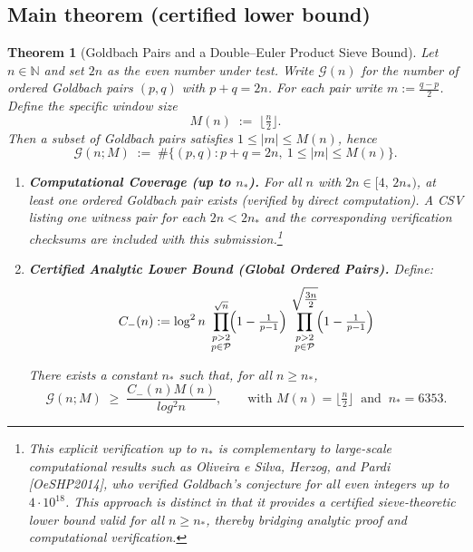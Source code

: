 \documentclass[11pt]{article}
\theoremstyle{inline}
\theoremstyle{break}
\theoremstyle{break}
\theoremstyle{break}
\newtheorem{theorem}{Theorem}
\theoremstyle{break}
\theoremstyle{break}
\theoremstyle{break}
\theoremstyle{break}
\theoremstyle{inline}
\newcommand{\xMertens}{6353} %
\newcommand{\CminusProduct}{C_{-}}
\newcommand{\nprodstar}{n_{\ast}}  %
\begin{document}
\subsection{Main theorem (certified lower bound)}\label{sec:main-thm}
\begin{theorem}[Goldbach Pairs and a Double–Euler Product Sieve Bound]
\label{thm:main}
Let \(n\in\mathbb{N}\) and set \(2n\) as the even number under test.
Write \(\mathcal{G}(n)\) for the number of \emph{ordered} Goldbach pairs \((p,q)\) with \(p+q=2n\).
For each pair write \(m := \tfrac{q-p}{2}\).
Define the specific window size
\begin{equation}
M(n) \;:=\; \bigl\lfloor \tfrac{n}{2} \bigr\rfloor .
\end{equation}
Then a subset of Goldbach pairs satisfies \(1 \le |m| \le M(n)\), hence
\begin{equation}
\mathcal{G}(n;M) \;:=\; \#\{(p,q): p+q=2n,\ 1\le |m| \le M(n)\}.
\end{equation}

\begin{enumerate}
   \item \textbf{Computational Coverage (up to \(\nprodstar\)).}
   For all \(n\) with \(2n \in [4,\,2\nprodstar)\), at least one ordered Goldbach pair exists
   (verified by direct computation). A CSV listing one witness pair for each \(2n<2\nprodstar\) and the
   corresponding verification checksums are included with this submission.\footnote{This explicit verification up to \( \nprodstar \) is complementary to large-scale computational results such as Oliveira e Silva, Herzog, and Pardi [OeSHP2014], who verified Goldbach’s conjecture for all even integers up to \( 4\cdot 10^{18} \).  This approach is distinct in that it provides a certified sieve-theoretic lower bound valid for all \( n \ge \nprodstar \), thereby bridging analytic proof and computational verification.}

  \item \textbf{Certified Analytic Lower Bound (Global Ordered Pairs).}
  Define:
  \begin{equation}
    \CminusProduct(n) := \log^2{n} \;
      \prod_{\substack{p>2\\ p\in\mathcal{P}}}^{\sqrt{n}}
        \!\Bigl(1-\tfrac{1}{p-1}\Bigr)\,
      \prod_{\substack{p>2\\ p\in\mathcal{P}}}^{\sqrt{\tfrac{3n}{2}}}
        \!\Bigl(1-\tfrac{1}{p-1}\Bigr)
     \label{eq:cminus-product-definition}
   \end{equation}

  There exists a constant \( \nprodstar \) such that, for all \(n \ge \nprodstar\),
  \begin{equation}
    \mathcal{G}(n;M)\;\ge\;\frac{\CminusProduct(n)M(n)}{log^2 n},
    \qquad
    \text{with } M(n)=\bigl\lfloor \tfrac{n}{2} \bigr\rfloor
    \ \text{ and }\
    \nprodstar=\xMertens .
    \label{eq:analytic-lower-bound-global}
  \end{equation}
\end{enumerate}
\end{theorem}
\end{document}
